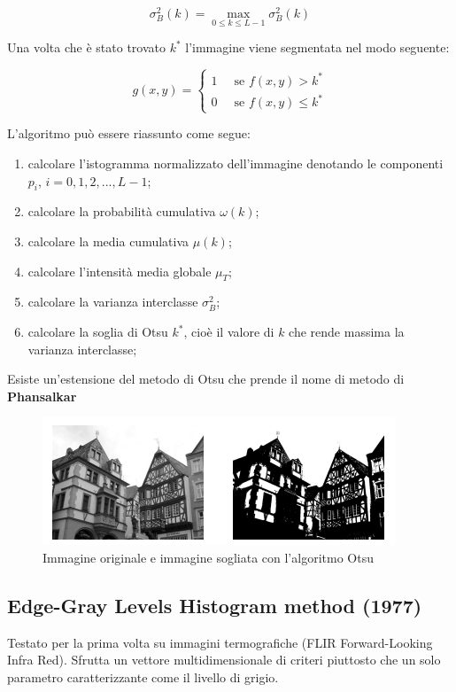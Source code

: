$$
    \sigma^2_B(k) = \max_{0\le k \le L-1} \sigma^2_B(k)
$$

Una volta che è stato trovato $k^*$ l'immagine viene segmentata nel modo seguente:

$$
    g(x,y) = \begin{cases} 1 & \ \text{ se } f(x,y) > k^*   \\
              0 & \ \text{ se } f(x,y) \le k^*
    \end{cases}
$$

L'algoritmo può essere riassunto come segue:

\begin{enumerate}
    \item calcolare l'istogramma normalizzato dell'immagine denotando le componenti $p_i$, $i=0,1,2,...,L-1$;
    \item calcolare la probabilità cumulativa $\omega(k)$;
    \item calcolare la media cumulativa $\mu(k)$;
    \item calcolare l'intensità media globale $\mu_T$;
    \item calcolare la varianza interclasse $\sigma^2_B$;
    \item  calcolare la soglia di Otsu $k^*$, cioè il valore di $k$ che rende massima la varianza interclasse;
\end{enumerate}

Esiste un'estensione del metodo di Otsu che prende il nome di metodo di \textbf{Phansalkar}


\begin{figure}[H]
    \centering
    \includegraphics[width=\linewidth, keepaspectratio]{capitoli/immagini/imgs/otsu.png}
    \caption{Immagine originale e immagine sogliata con l'algoritmo Otsu}
\end{figure}

\subsection{Edge-Gray Levels Histogram method (1977)}
Testato per la prima volta su immagini
termografiche (FLIR Forward-Looking Infra Red). Sfrutta un vettore
multidimensionale di criteri piuttosto che un solo parametro
caratterizzante come il livello di grigio.

